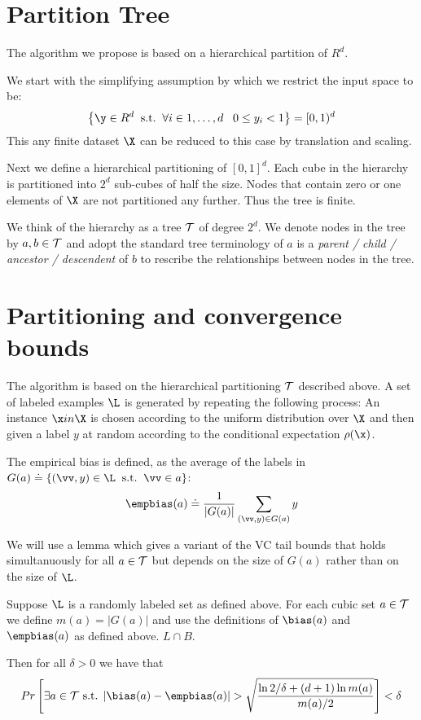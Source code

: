 \iffalse

\section{Partition Tree}

The algorithm we propose is based on a hierarchical partition of $R^d$.

We start with the simplifying assumption by which we restrict the
input space to be:
\newcommand{\Cube}{\text{Cube}}
\[
\left\{\y \in R^d\;\; \text{s.t.}\;\; \forall i \in 1,\ldots,d\;\;\; 0
\leq y_i < 1   \right\} = [0,1)^d
\]
This any finite dataset $\X$ can be reduced to this case by
translation and scaling.

\newcommand{\tree}{{\cal T}}

Next we define a hierarchical partitioning of $[0,1]^d$. Each cube
in the hierarchy is partitioned into $2^d$ sub-cubes of half the size.
Nodes that contain zero or one elements of $\X$ are not partitioned
any further. Thus the tree is finite. 

We think of the hierarchy as a tree $\tree$ of degree $2^d$. We denote
nodes in the tree by $a,b \in \tree$ and adopt the
standard tree terminology of $a$ is a {\em parent / child / ancestor /
  descendent} of $b$ to rescribe the relationships between nodes in
the tree.


\section{Partitioning and convergence bounds}

The algorithm is based on the hierarchical partitioning $\tree$
described above. A set of labeled examples $\L$ is generated by
repeating the following process: An instance $\x in \X$ is chosen
according to the uniform distribution over $\X$ and then given a label
$y$ at random according to the conditional expectation $\rho(\x)$.

The empirical bias is defined, as the average of the labels in
$G(a)\doteq \{(\vv,y) \in \L\;\; \text{s.t.}\;\; \vv \in a\}$:
$$
\empbias(a)\doteq \frac{1}{|G(a)|} \sum_{(\vv,y) \in G(a)} y
$$

We will use a lemma which gives a variant of the VC tail bounds that
holds simultanuously for all $a \in \tree$ but depends on the size of
$G(a)$ rather than on the size of $\L$.

\begin{lemma}
  Suppose $\L$ is a randomly labeled set as defined above.
  For each cubic set $a\in \tree$ we define $m(a)=|G(a)|$ and use the
  definitions of $\bias(a)$ and $\empbias(a)$ as defined above. $L \cap B$. 

Then for all $\delta>0$ we have that 
$$
Pr\left[ \exists a \in \tree \text{ s.t. }  |\bias(a) - \empbias(a)| >
  \sqrt{\frac{\ln 2/\delta+(d+1) \ln m(a)}{m(a)/2}} \right] < \delta
$$
\end{lemma}

